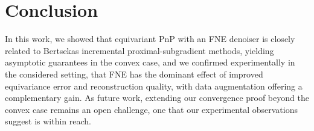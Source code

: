 \documentclass{article}
\begin{document}

\section{Conclusion}\vspace{-0.4cm}

In this work, we showed that equivariant PnP with an FNE denoiser is closely related to Bertsekas incremental proximal-subgradient methods, yielding asymptotic guarantees in the convex case, and we confirmed experimentally in the considered setting, that FNE has the dominant effect of improved equivariance error and reconstruction quality, with data augmentation offering a complementary gain. As future work, extending our convergence proof beyond the convex case remains an open challenge, one that our experimental observations suggest is within reach.



\end{document}
